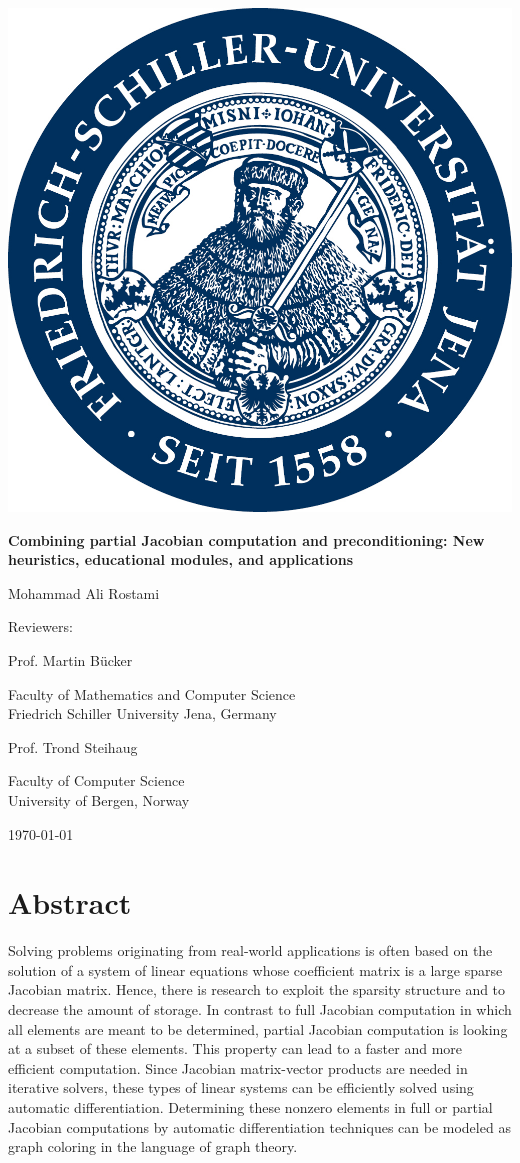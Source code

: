 \documentclass[12pt, twoside,a4paper,toc=bibliography]{scrbook}
\begin{document}
\begin{titlepage}
\centering
\includegraphics[width=0.3\linewidth]{logo}
\par
\vspace{1cm}
{\Large\textbf{Combining partial Jacobian computation and preconditioning:
New heuristics, educational modules, and applications}\par}
\vspace{1cm}
{\Large Mohammad Ali Rostami\par}
\vspace{2cm}
{\large Reviewers:\par}
\vspace{0.6cm}
{\Large Prof. Martin B{\"u}cker\par}
{\Large Faculty of Mathematics and Computer Science\\Friedrich Schiller University Jena, Germany\par}
\vspace{1cm}
{\Large Prof. Trond Steihaug\par}
{\Large Faculty of Computer Science\\University of Bergen, Norway\par}
\vspace{1cm}
{\Large \today}
\end{titlepage}
\chapter*{Abstract}
Solving problems originating from real-world applications is often based
on the solution of a system of linear equations whose coefficient matrix is a large sparse Jacobian matrix.
Hence, there is research to exploit the sparsity structure and to decrease the amount of storage.
In contrast to full Jacobian computation in which all elements are meant to be determined,
partial Jacobian computation is looking at a subset of these elements.
This property can lead to a faster and more efficient computation.
Since Jacobian matrix-vector products are needed in iterative solvers,
these types of linear systems can be efficiently solved using automatic differentiation.
Determining these nonzero elements in full or partial Jacobian computations by automatic differentiation techniques
can be modeled as graph coloring in the language of graph theory.
\end{document}
